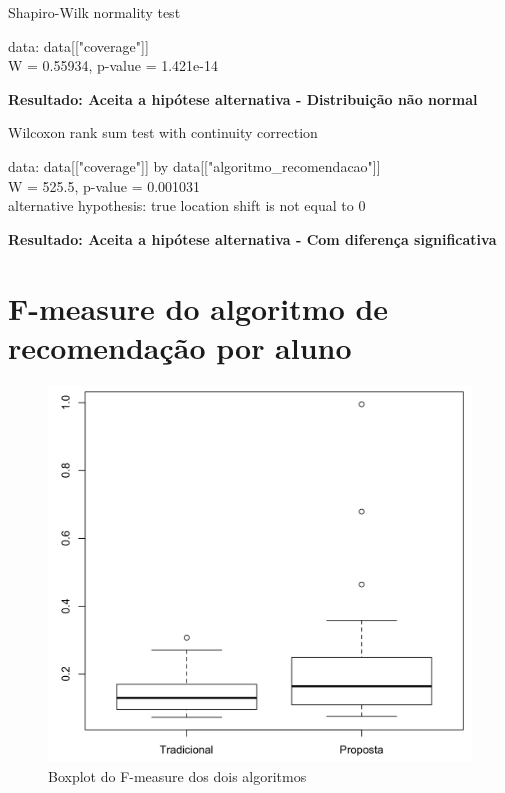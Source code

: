     Shapiro-Wilk normality test

\noindent
data:  data[["coverage"]]\\
W = 0.55934, p-value = 1.421e-14

\noindent
\textbf{Resultado: Aceita a hipótese alternativa - Distribuição não normal}

  Wilcoxon rank sum test with continuity correction

\noindent
data:  data[["coverage"]] by data[["algoritmo\_recomendacao"]]\\
W = 525.5, p-value = 0.001031\\
alternative hypothesis: true location shift is not equal to 0

\noindent
\textbf{Resultado: Aceita a hipótese alternativa - Com diferença significativa}

\newpage
\section{F-measure do algoritmo de recomendação por aluno}

\begin{figure}[htb]
  \caption{\label{fig:media-harmonica-boxplot}Boxplot do F-measure dos dois algoritmos}
  \begin{center}
      \includegraphics[scale=0.4]{./Figuras/media-harmonica-boxplot.png}
  \end{center}
\end{figure}

